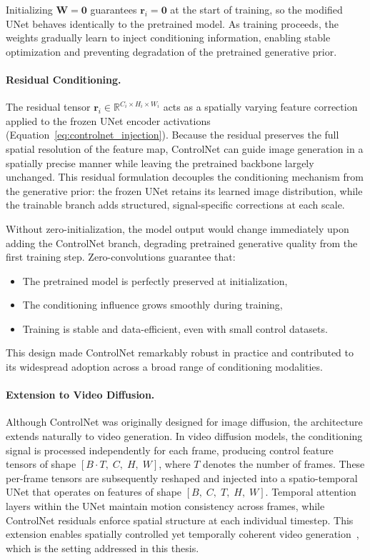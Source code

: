 Initializing $\mathbf{W} = \mathbf{0}$ guarantees $\mathbf{r}_i = \mathbf{0}$ at the start of training, so the modified UNet behaves identically to the pretrained model. As training proceeds, the weights gradually learn to inject conditioning information, enabling stable optimization and preventing degradation of the pretrained generative prior.

\paragraph{Residual Conditioning.}
The residual tensor $\mathbf{r}_i \in \mathbb{R}^{C_i \times H_i \times W_i}$ acts as a spatially varying feature correction applied to the frozen UNet encoder activations (Equation~\eqref{eq:controlnet_injection}). Because the residual preserves the full spatial resolution of the feature map, ControlNet can guide image generation in a spatially precise manner while leaving the pretrained backbone largely unchanged. This residual formulation decouples the conditioning mechanism from the generative prior: the frozen UNet retains its learned image distribution, while the trainable branch adds structured, signal-specific corrections at each scale.

Without zero-initialization, the model output would change immediately upon adding the ControlNet branch, degrading pretrained generative quality from the first training step. Zero-convolutions guarantee that:
\begin{itemize}
    \item The pretrained model is perfectly preserved at initialization,
    \item The conditioning influence grows smoothly during training,
    \item Training is stable and data-efficient, even with small control datasets.
\end{itemize}
This design made ControlNet remarkably robust in practice and contributed to its widespread adoption across a broad range of conditioning modalities.

\paragraph{Extension to Video Diffusion.}
Although ControlNet was originally designed for image diffusion, the architecture extends naturally to video generation. In video diffusion models, the conditioning signal is processed independently for each frame, producing control feature tensors of shape $[B \cdot T,\; C,\; H,\; W]$, where $T$ denotes the number of frames. These per-frame tensors are subsequently reshaped and injected into a spatio-temporal UNet that operates on features of shape $[B,\; C,\; T,\; H,\; W]$. Temporal attention layers within the UNet maintain motion consistency across frames, while ControlNet residuals enforce spatial structure at each individual timestep. This extension enables spatially controlled yet temporally coherent video generation~\cite{hu2023videocontrolnet, chen2023controlavideo}, which is the setting addressed in this thesis.

